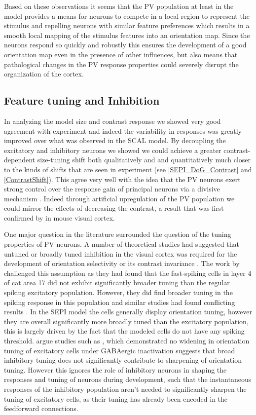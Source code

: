 Based on these observations it seems that the PV population at least
in the model provides a means for neurons to compete in a local region
to represent the stimulus and repelling neurons with similar feature
preferences which results in a smooth local mapping of the stimulus
features into an orientation map. Since the neurons respond so quickly
and robustly this ensures the development of a good orientation map
even in the presence of other influences, but also means that
pathological changes in the PV response properties could severely
disrupt the organization of the cortex.

\subsection{Feature tuning and Inhibition}

In analyzing the model size and contrast response we showed very good
agreement with experiment and indeed the variability in responses was
greatly improved over what was observed in the SCAL model. By
decoupling the excitatory and inhibitory neurons we showed we could
achieve a greater contrast-dependent size-tuning shift both
qualitatively and and quantitatively much closer to the kinds of
shifts that are seen in experiment (see \ref{SEPI_DoG_Contrast} and
\ref{ContrastShift}). This agree very well with the idea that the PV
neurons exert strong control over the response gain of principal
neurons via a divisive mechanism \citep{Wilson2012}. Indeed through
artificial upregulation of the PV population we could mirror the
effects of decreasing the contrast, a result that was first confirmed
by \cite{Nienborg2013} in mouse visual cortex.

One major question in the literature surrounded the question of the
tuning properties of PV neurons. A number of theoretical studies had
suggested that untuned or broadly tuned inhibition in the visual
cortex was required for the development of orientation selectivity or
its contrast invariance \citep{Somers1995, Troyer1998}. The work by
\cite{Cardin2007} challenged this assumption as they had found that
the fast-spiking cells in layer 4 of cat area 17 did not exhibit
significantly broader tuning than the regular spiking excitatory
population. However, they did find broader tuning in the spiking
response in this population and similar studies had found conflicting
results \citep{Hirsch2003, Nowak2008}. In the SEPI model the cells
generally display orientation tuning, however they are overall
significantly more broadly tuned than the excitatory population, this
is largely driven by the fact that the modeled cells do not have any
spiking threshold. \cite{Cardin2007} argue studies such as
\cite{Nelson1994}, which demonstrated no widening in orientation
tuning of excitatory cells under GABAergic inactivation suggests that
broad inhibitory tuning does not significantly contribute to
sharpening of orientation tuning. However this ignores the role of
inhibitory neurons in shaping the responses and tuning of neurons
during development, such that the instantaneous responses of the
inhibitory population aren't needed to significantly sharpen the
tuning of excitatory cells, as their tuning has already been encoded
in the feedforward connections.


